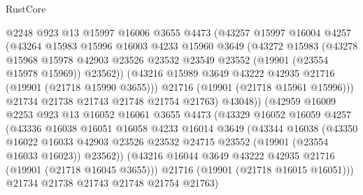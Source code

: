 \begin{lexlean}{RustCore}
\begin{coremodule}
                    @2248
                    @923
                    @13
                    @15997
                    @16006
                    @3655
                    @4473
                    (@43257
                      @15997
                      @16004
                      @4257
                      (@43264
                        @15983
                        @15996
                        @16003
                        @4233
                        @15960
                        @3649
                        (@43272
                          @15983
                          (@43278
                            @15968
                            @15978
                            @42903
                            @23526
                            @23532
                            @23549
                            @23552
                            (@19901 (@23554 @15978 @15969))
                            @23562))
                        (@43216 @15989 @3649 @43222 @42935 @21716 (@19901 (@21718 @15990 @3655)))
                        @21716
                        (@19901 (@21718 @15961 @15996)))
                      @21734
                      @21738
                      @21743
                      @21748
                      @21754
                      @21763)
                    @43048))
                (@42959
                  @16009
                  @2253
                  @923
                  @13
                  @16052
                  @16061
                  @3655
                  @4473
                  (@43329
                    @16052
                    @16059
                    @4257
                    (@43336
                      @16038
                      @16051
                      @16058
                      @4233
                      @16014
                      @3649
                      (@43344
                        @16038
                        (@43350
                          @16022
                          @16033
                          @42903
                          @23526
                          @23532
                          @24715
                          @23552
                          (@19901 (@23554 @16033 @16023))
                          @23562))
                      (@43216 @16044 @3649 @43222 @42935 @21716 (@19901 (@21718 @16045 @3655)))
                      @21716
                      (@19901 (@21718 @16015 @16051)))
                    @21734
                    @21738
                    @21743
                    @21748
                    @21754
                    @21763)

\end{coremodule}
\end{lexlean}
